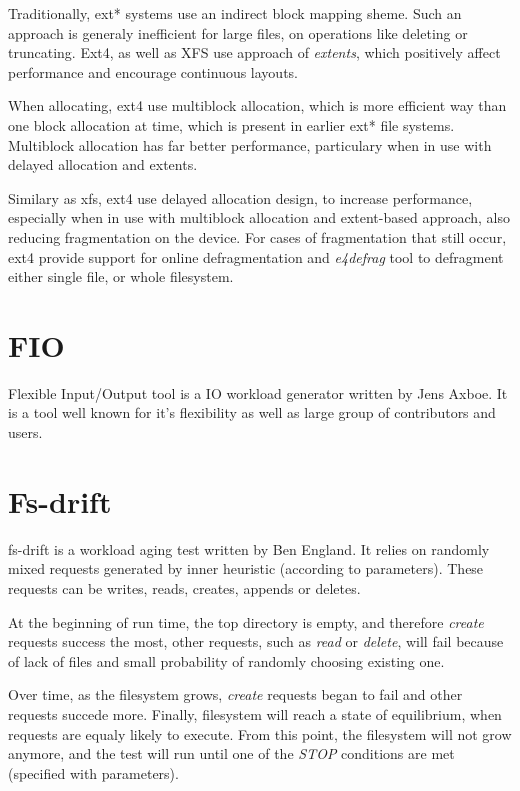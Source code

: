 \documentclass[
  color, %
  table, %
  lof,   %
  lot,   %
]{fithesis3}
\begin{document}
Traditionally, ext* systems use an indirect block mapping sheme. Such an approach is generaly inefficient for large files, on operations like deleting or truncating. Ext4, as well as XFS use approach of \textit{extents}, which positively affect performance and encourage continuous layouts.

When allocating, ext4 use multiblock allocation, which is more efficient way than one block allocation at time, which is present in earlier ext* file systems. Multiblock allocation has far better performance, particulary when in use with delayed allocation and extents.

Similary as xfs, ext4 use delayed allocation design, to increase performance, especially when in use with multiblock allocation and extent-based approach, also reducing fragmentation on the device. For cases of fragmentation that still occur, ext4 provide support for online defragmentation and \textit{e4defrag} tool to defragment either single file, or whole filesystem.

\section{FIO}
Flexible Input/Output tool is a IO workload generator written by Jens Axboe. It is a tool well known for it's flexibility as well as large group of contributors and users.


\section{Fs-drift}
fs-drift is a workload aging test written by Ben England. It relies on randomly mixed requests generated by inner heuristic (according to parameters). These requests can be writes, reads, creates, appends or deletes.

At the beginning of run time, the top directory is empty, and therefore \textit{create} requests success the most, other requests, such as \textit{read} or \textit{delete}, will fail because of lack of files and small probability of randomly choosing existing one. 

Over time, as the filesystem grows, \textit{create} requests began to fail and other requests succede more. Finally, filesystem will reach a state of equilibrium, when requests are equaly likely to execute. From this point, the filesystem will not grow anymore, and the test will run until one of the \textit{STOP} conditions are met (specified with parameters).
\end{document}

